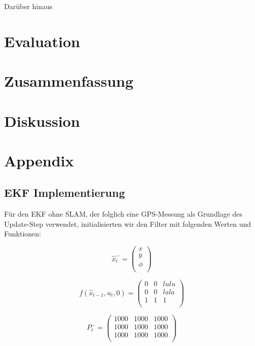 \documentclass[11pt]{article}
\begin{document}
Darüber hinaus


\section{Evaluation}

\section{Zusammenfassung}\label{Zusammenfassung}

\section{Diskussion}\label{Diskussion}

\section{Appendix}\label{Appendix}
\subsection{EKF Implementierung}
Für den EKF ohne SLAM, der folglich eine GPS-Messung als Grundlage des Update-Step verwendet, initialisierten wir den Filter mit folgenden Werten und Funktionen:

\begin{equation}\label{EKF-State-Vector}
	\hat{x}_t^- = \begin{pmatrix}
		x \\
		y \\
		\phi \\
	  \end{pmatrix}
\end{equation}

\begin{equation}\label{EKF-Motion-Model}
	f(\hat{x}_{t-1},u_t,0) = \begin{pmatrix}
		0 & 0 & lulu \\
		0 & 0 & lala \\
		1 & 1 & 1 \\
	\end{pmatrix}
\end{equation}

\begin{equation}\label{EKF-Initiale-Kovarianzmatrix}
	P_t^- = \begin{pmatrix}
		1000 & 1000 & 1000 \\
		1000 & 1000 & 1000 \\
		1000 & 1000 & 1000 \\
	  \end{pmatrix}
\end{equation}
\end{document}
